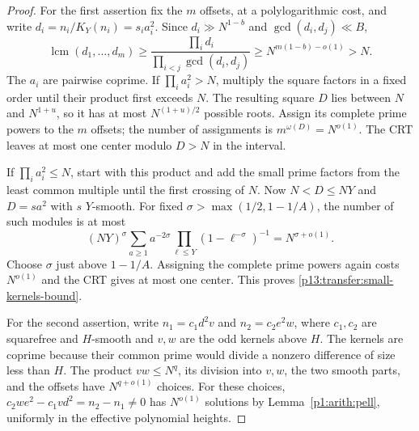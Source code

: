 \begin{proof}
For the first assertion fix the $m$ offsets, at a polylogarithmic cost,
and write $d_i=n_i/K_Y(n_i)=s_i a_i^2$. Since
$d_i\gg N^{1-b}$ and $\gcd(d_i,d_j)\ll B$,
\[
 \operatorname{lcm}(d_1,\ldots,d_m)
 \geq\frac{\prod_i d_i}{\prod_{i<j}\gcd(d_i,d_j)}
 \geq N^{m(1-b)-o(1)}>N.
\]
The $a_i$ are pairwise coprime. If $\prod_i a_i^2>N$, multiply the
square factors in a fixed order until their product first exceeds $N$.
The resulting square $D$ lies between $N$ and $N^{1+u}$, so it has
at most $N^{(1+u)/2}$ possible roots. Assign its complete prime powers
to the $m$ offsets; the number of assignments is
$m^{\omega(D)}=N^{o(1)}$. The CRT leaves at most one center modulo
$D>N$ in the interval.

If $\prod_i a_i^2\leq N$, start with this product and add the small
prime factors from the least common multiple until the first crossing
of $N$. Now $N<D\leq NY$ and $D=sa^2$ with $s$ $Y$-smooth.
For fixed $\sigma>\max(1/2,1-1/A)$, the number of such modules is at most
\[
 (NY)^\sigma\sum_{a\geq1}a^{-2\sigma}
       \prod_{\ell\leq Y}(1-\ell^{-\sigma})^{-1}
       =N^{\sigma+o(1)}.
\]
Choose $\sigma$ just above $1-1/A$. Assigning the complete prime powers
again costs $N^{o(1)}$ and the CRT gives at most one center. This proves
\eqref{p13:transfer:small-kernels-bound}.

For the second assertion, write $n_1=c_1d^2v$ and $n_2=c_2e^2w$,
where $c_1,c_2$ are squarefree and $H$-smooth and $v,w$ are the odd
kernels above $H$. The kernels are coprime because their common prime
would divide a nonzero difference of size less than $H$.
The product $vw\leq N^q$, its division into $v,w$, the two smooth
parts, and the offsets have $N^{q+o(1)}$ choices. For these choices,
$c_2we^2-c_1vd^2=n_2-n_1\ne0$ has $N^{o(1)}$ solutions by
Lemma~\ref{p1:arith:pell}, uniformly in the effective polynomial heights.
\end{proof}
